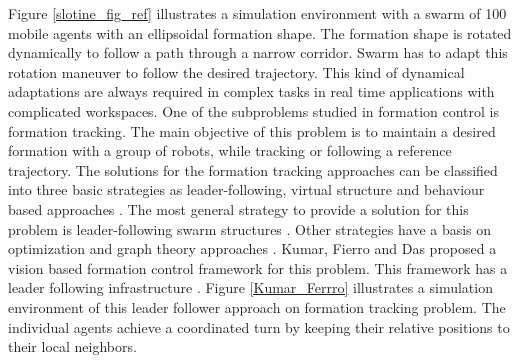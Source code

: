 Figure \ref{slotine_fig_ref} illustrates a simulation environment with a swarm of 100 mobile agents with an ellipsoidal formation shape. The formation shape is rotated dynamically to follow a path through a narrow corridor. Swarm has to adapt this  rotation maneuver to follow the desired trajectory. This kind of dynamical adaptations are always required in complex tasks in real time applications with complicated workspaces. 
One of the subproblems studied in formation control is formation tracking. The main objective of this problem is to maintain a desired formation with a group of robots, while tracking or following a reference trajectory. The solutions for the formation tracking approaches can be classified into three basic strategies as leader-following, virtual structure and behaviour based approaches \cite{12}. The most general strategy to provide a solution for this problem is leader-following swarm structures \cite{18}. Other strategies have a basis on optimization and graph theory approaches \cite{12}. Kumar, Fierro and Das proposed a vision based formation control framework  for this problem. This framework has a leader following infrastructure \cite{18}. Figure \ref{Kumar_Ferrro} illustrates a simulation environment of this leader follower approach on formation tracking problem. The individual agents achieve a coordinated turn by keeping their relative positions to their local neighbors. 

